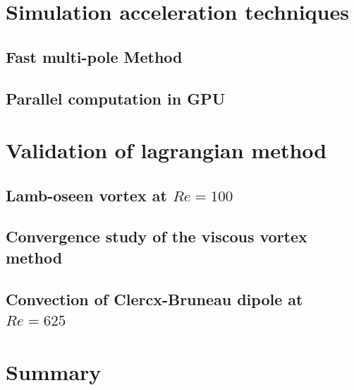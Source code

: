 \section{Simulation acceleration techniques}
\label{sec:sat}
%
\subsection{Fast multi-pole Method}
%
\subsection{Parallel computation in GPU}
%
\section{Validation of lagrangian method}

\subsection{Lamb-oseen vortex at $Re=100$}

\subsection{Convergence study of the viscous vortex method}
%
\subsection{Convection of Clercx-Bruneau dipole at $Re=625$}
%
\section{Summary}
%
